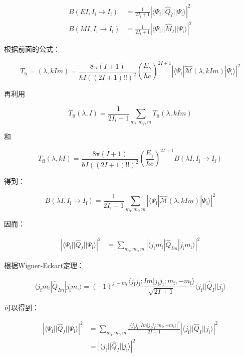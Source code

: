 \begin{align}
B(EI,I_{\text{i}}\rightarrow I_{\text{f}}) & =\frac{1}{2I_{\text{i}}+1}\left|\langle\Psi_{\text{f}}||\hat{Q}_{I}||\Psi_{\text{i}}\rangle\right|^{2}\\
B(MI,I_{\text{i}}\rightarrow I_{\text{f}}) & =\frac{1}{2I_{\text{i}}+1}\left|\langle\Psi_{\text{f}}||\hat{M}_{I}||\Psi_{\text{i}}\rangle\right|^{2}
\end{align}

\begin{booknote*}
根据前面的公式：

\[
T_{\text{fi}}=(\lambda,kIm)=\frac{8\mathrm{\pi}(I+1)}{\hbar I((2I+1)!!)^{2}}\left(\frac{E_{\gamma}}{\hbar c}\right)^{2I+1}\left|\langle\Psi_{\text{f}}|\hat{\mathcal{M}}(\lambda,kIm)|\Psi_{\text{i}}\rangle\right|^{2}
\]

再利用

\[
T_{\text{fi}}(\lambda,I)=\frac{1}{2I_{i}+1}\sum_{m_{i},m_{f},m}T_{\text{fi}}(\lambda,kIm)
\]

和

\[
T_{\text{fi}}(\lambda,kI)=\frac{8\mathrm{\pi}(I+1)}{\hbar I((2I+1)!!)^{2}}\left(\frac{E_{\gamma}}{\hbar c}\right)^{2I+1}B(\lambda I,I_{\text{i}}\rightarrow I_{\text{f}})
\]

得到：

\[
B(\lambda I,I_{\text{i}}\rightarrow I_{\text{f}})=\frac{1}{2I_{\text{i}}+1}\sum_{m_{\text{i}},m_{\text{f}},m}\left|\langle\Psi_{\text{f}}|\hat{\mathcal{M}}(\lambda,kIm)|\Psi_{\text{i}}\rangle\right|^{2}
\]

因而：

\begin{align*}
\left|\langle\Psi_{\text{f}}||\hat{Q}_{I}||\Psi_{\text{i}}\rangle\right|^{2} & =\sum_{m_{\text{i}},m_{\text{f}},m}\left|\langle j_{\text{f}}m_{\text{f}}|\hat{Q}_{Im}|j_{\text{i}}m_{\text{i}}\rangle\right|^{2}
\end{align*}

根据Wigner-Eckart定理：

\[
\langle j_{\text{f}}m_{\text{f}}|\hat{Q}_{Im}|j_{\text{i}}m_{\text{i}}\rangle=(-1)^{j_{\text{i}}-m_{\text{i}}}\frac{\langle j_{\text{f}}j_{\text{i}};Im|j_{\text{f}}j_{\text{i}};m_{\text{f}},-m_{\text{i}}\rangle}{\sqrt{2I+1}}\langle j_{\text{f}}||\hat{Q}_{I}||j_{\text{i}}\rangle
\]

可以得到：

\begin{align*}
\left|\langle\Psi_{\text{f}}||\hat{Q}_{I}||\Psi_{\text{i}}\rangle\right|^{2} & =\sum_{m_{\text{i}},m_{\text{f}},m}\frac{\left|\langle j_{\text{f}}j_{\text{i}};Im|j_{\text{f}}j_{\text{i}};m_{\text{f}},-m_{\text{i}}\rangle\right|^{2}}{2I+1}\left|\langle j_{\text{f}}||\hat{Q}_{I}||j_{\text{i}}\rangle\right|^{2}\\
 & =\left|\langle j_{\text{f}}||\hat{Q}_{I}||j_{\text{i}}\rangle\right|^{2}
\end{align*}
\end{booknote*}
